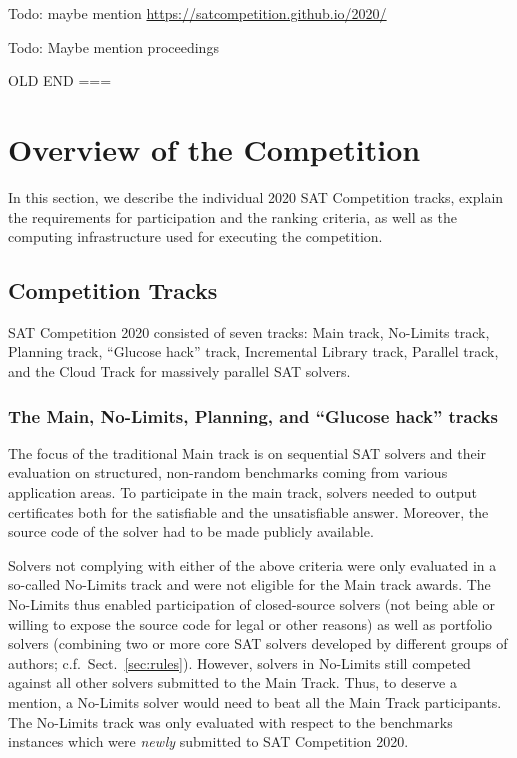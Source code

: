 \documentclass{elsarticle}
\newcommand{\todo}[1]{{\color{purple}Todo: #1}}
\begin{document}
\todo{maybe mention \url{https://satcompetition.github.io/2020/}}

\todo{Maybe mention proceedings \cite{SC2020}}

OLD END ===

\section{Overview of the Competition}
\label{sec:overview}

In this section, we describe the individual 2020 SAT Competition tracks,
explain the requirements for participation %
and the ranking criteria, as well as
the computing infrastructure used for executing the competition.

\subsection{Competition Tracks}

SAT Competition 2020 consisted of seven tracks:
Main track, No-Limits track, Planning track, ``Glucose hack'' track,
Incremental Library track, Parallel track,
and the Cloud Track for massively parallel SAT solvers. %

\subsubsection{The Main, No-Limits, Planning, and ``Glucose hack'' tracks}

The focus of the traditional Main track is on sequential SAT solvers and their evaluation on structured, non-random benchmarks coming from various application areas. To participate in the main track, solvers needed to output certificates both for the satisfiable and the unsatisfiable answer. Moreover, the source code of the solver had to be made publicly available. 

Solvers not complying with either of the above criteria were only evaluated in a so-called No-Limits track and were not eligible for the Main track awards.
The No-Limits thus enabled participation of closed-source solvers (not being able or willing to expose the source code for legal or other reasons) 
as well as portfolio solvers (combining two or more core SAT solvers developed by different groups of authors; c.f.~Sect.~\ref{sec:rules}).
However, solvers in No-Limits still competed against all other solvers submitted to the Main Track.
Thus, to deserve a mention, a No-Limits solver would need to beat all the Main Track participants.
The No-Limits track was only evaluated with respect to the benchmarks instances which were \emph{newly} submitted to SAT Competition 2020.
\end{document}

